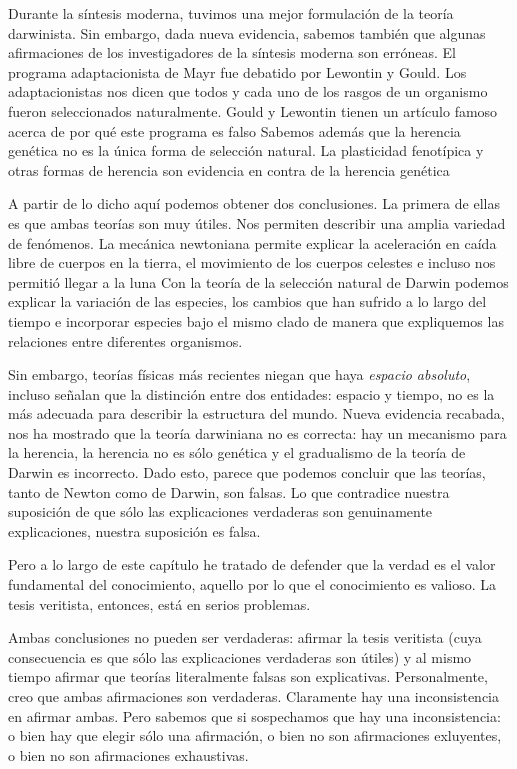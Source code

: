 {{{{{Durante la síntesis moderna, tuvimos una mejor formulación de la teoría darwinista.
Sin embargo, dada nueva evidencia, sabemos también que algunas afirmaciones de los investigadores de la síntesis moderna son erróneas.
El programa adaptacionista de Mayr fue debatido por Lewontin y Gould.
Los adaptacionistas nos dicen que todos y cada uno de los rasgos de un organismo fueron seleccionados naturalmente.
Gould y Lewontin tienen un artículo famoso acerca de por qué este programa es falso%
Sabemos además que la herencia genética no es la única forma de selección natural.
La plasticidad fenotípica y otras formas de herencia son evidencia en contra de la herencia genética %

A partir de lo dicho aquí podemos obtener dos conclusiones.
La primera de ellas es que ambas teorías son muy útiles.
Nos permiten describir una amplia variedad de fenómenos.
La mecánica newtoniana permite explicar la aceleración en caída libre de cuerpos en la tierra, el movimiento de los cuerpos celestes e incluso nos permitió llegar a la luna %
Con la teoría de la selección natural de Darwin podemos explicar la variación de las especies, los cambios que han sufrido a lo largo del tiempo e incorporar especies bajo el mismo clado de manera que expliquemos las relaciones entre diferentes organismos.

Sin embargo, teorías físicas más recientes niegan que haya \emph{espacio absoluto}, incluso señalan que la distinción entre dos entidades: espacio y tiempo, no es la más adecuada para describir la estructura del mundo.
Nueva evidencia recabada, nos ha mostrado que la teoría darwiniana no es correcta: hay un mecanismo para la herencia, la herencia no es sólo genética y el gradualismo de la teoría de Darwin es incorrecto.
Dado esto, parece que podemos concluir que las teorías, tanto de Newton como de Darwin, son falsas.
Lo que contradice nuestra suposición de que sólo las explicaciones verdaderas son genuinamente explicaciones, nuestra suposición es falsa.

Pero a lo largo de este capítulo he tratado de defender que la verdad es el valor fundamental del conocimiento, aquello por lo que el conocimiento es valioso.
La tesis veritista, entonces, está en serios problemas.

Ambas conclusiones no pueden ser verdaderas: afirmar la tesis veritista (cuya consecuencia es que sólo las explicaciones verdaderas son útiles) y al mismo tiempo afirmar que teorías literalmente falsas son explicativas.
Personalmente, creo que ambas afirmaciones son verdaderas.
Claramente hay una inconsistencia en afirmar ambas.
Pero sabemos que si sospechamos que hay una inconsistencia: o bien hay que elegir sólo una afirmación, o bien no son afirmaciones exluyentes, o bien no son afirmaciones exhaustivas.

}}}}}
